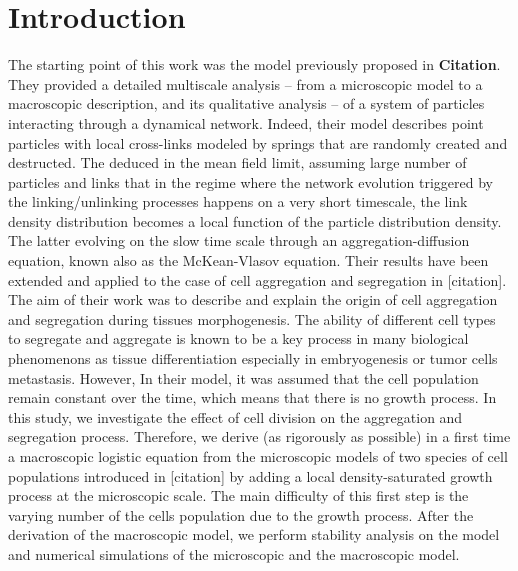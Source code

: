 \section*{Introduction}
The starting point of this work was the model previously proposed in \textbf{Citation}. They provided a detailed multiscale analysis -- from a microscopic model to a macroscopic description, and its qualitative analysis -- of a system of particles interacting through a dynamical network. Indeed, their model describes point particles with local cross-links modeled by springs that are randomly created and destructed. The deduced in the mean field limit, assuming large number of particles and links that in the regime where the network evolution triggered by the linking/unlinking processes happens on a very short timescale, the link density distribution becomes a local function of the particle distribution density. The latter evolving on the slow time scale through an aggregation-diffusion equation, known also as the McKean-Vlasov equation. Their results have been extended and applied to the case of cell aggregation and segregation in [citation]. The aim of their work was to describe and explain the origin of cell aggregation and segregation during tissues morphogenesis. The ability of different cell types to segregate and aggregate is known to be a key process in many biological phenomenons as tissue differentiation especially in embryogenesis or tumor cells metastasis. 
	However, In their model, it was assumed that the cell population remain constant over the time, which means that there is no growth process. In this study, we investigate the effect of cell division on the aggregation and segregation process. Therefore, we derive (as rigorously as possible) in a first time a macroscopic logistic equation from the microscopic models of two species of cell populations introduced in [citation] by adding a local density-saturated growth process at the microscopic scale. The main difficulty of this first step is the varying number of the cells population due to the growth process. After the derivation of the macroscopic model, we perform stability analysis on the model and numerical simulations of the microscopic and the macroscopic model.